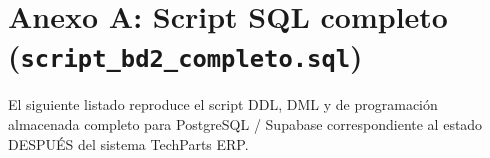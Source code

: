 
\section{Anexo A: Script SQL completo (\texttt{script\_bd2\_completo.sql})}

El siguiente listado reproduce el script DDL, DML y de programaci\'on almacenada completo para PostgreSQL / Supabase correspondiente al estado DESPU\'ES del sistema TechParts ERP.


